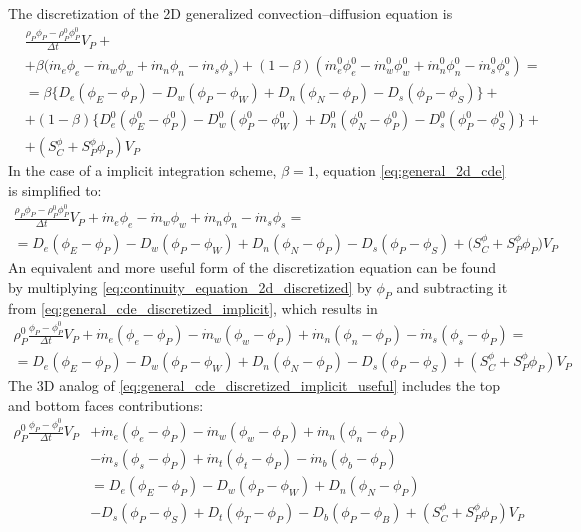 The discretization of the 2D generalized convection--diffusion equation is
\begin{align}
	&\frac{\rho_P \phi_P - \rho_P^0 \phi_P^0}{\Delta t} V_P + \nonumber \\
	&+ 
	\beta 
	\Big( \dot{m}_e \phi_e - \dot{m}_w \phi_w + \dot{m}_n \phi_n - \dot{m}_s \phi_s \Big) + 
	(1 - \beta) 
	\left( \dot{m}_e^0 \phi_e^0 - \dot{m}_w^0 \phi_w^0 + \dot{m}_n^0 \phi_n^0 - \dot{m}_s^0 \phi_s^0 \right) =  \nonumber \\
	&= 
	\beta 
	\Big\{ 
	D_e (\phi_E - \phi_P) - D_w (\phi_P - \phi_W) + D_n (\phi_N - \phi_P) - D_s (\phi_P - \phi_S) 
	\Big\} + \nonumber \\
	&+ (1 - \beta)
	\Big\{ 
	D_e^0 (\phi_E^0 - \phi_P^0) - D_w^0 (\phi_P^0 - \phi_W^0) + 
	D_n^0 (\phi_N^0 - \phi_P^0) - D_s^0 (\phi_P^0 - \phi_S^0)
	\Big\} + \nonumber \\
	&+ \left( S_C^\phi + S_P^\phi \phi_P \right) V_P \label{eq:general_2d_cde}
\end{align}
In the case of a implicit integration scheme, \ie $\beta = 1$, equation
\eqref{eq:general_2d_cde} is simplified to:
\begin{multline} \label{eq:general_cde_discretized_implicit}
	\frac{\rho_P \phi_P - \rho_P^0 \phi_P^0}{\Delta t} V_P + 
	\dot{m}_e \phi_e - \dot{m}_w \phi_w + \dot{m}_n \phi_n - \dot{m}_s \phi_s = \\ = 
	D_e (\phi_E - \phi_P) - D_w (\phi_P - \phi_W) + D_n (\phi_N - \phi_P) - D_s (\phi_P - \phi_S) +
	\big( S_C^\phi + S_P^\phi \phi_P \big) V_P
\end{multline}
An equivalent and more useful form of the discretization equation can be found
by multiplying \eqref{eq:continuity_equation_2d_discretized} by $\phi_P$ and
subtracting it from \eqref{eq:general_cde_discretized_implicit}, which results
in
\begin{multline} \label{eq:general_cde_discretized_implicit_useful}
	\rho_P^0 \frac{\phi_P - \phi_P^0}{\Delta t} V_P
	+ \dot{m}_e (\phi_e - \phi_P) - \dot{m}_w (\phi_w - \phi_P) 
	+ \dot{m}_n (\phi_n - \phi_P) - \dot{m}_s (\phi_s - \phi_P) 
	= \\
	= D_e (\phi_E - \phi_P) - D_w (\phi_P - \phi_W)
	+ D_n (\phi_N - \phi_P) - D_s (\phi_P - \phi_S)
	+ (S_C^\phi + S_P^\phi \phi_P) V_P
\end{multline}
The 3D analog of \eqref{eq:general_cde_discretized_implicit_useful} includes the
top and bottom faces contributions:
\begin{align} \label{eq:general_cde_discretized_implicit_useful_3d}
	\rho_P^0 \frac{\phi_P - \phi_P^0}{\Delta t} V_P
	&+ \dot{m}_e (\phi_e - \phi_P) - \dot{m}_w (\phi_w - \phi_P)  + \dot{m}_n (\phi_n - \phi_P) 
	\nonumber \\
	&- \dot{m}_s (\phi_s - \phi_P) + \dot{m}_t (\phi_t - \phi_P) - \dot{m}_b (\phi_b - \phi_P) 
	\nonumber \\
	&= D_e (\phi_E - \phi_P) - D_w (\phi_P - \phi_W) + D_n (\phi_N - \phi_P) 
	\nonumber \\
	&- D_s (\phi_P - \phi_S) + D_t (\phi_T - \phi_P) - D_b (\phi_P - \phi_B) + (S_C^\phi + S_P^\phi \phi_P) V_P
\end{align}

